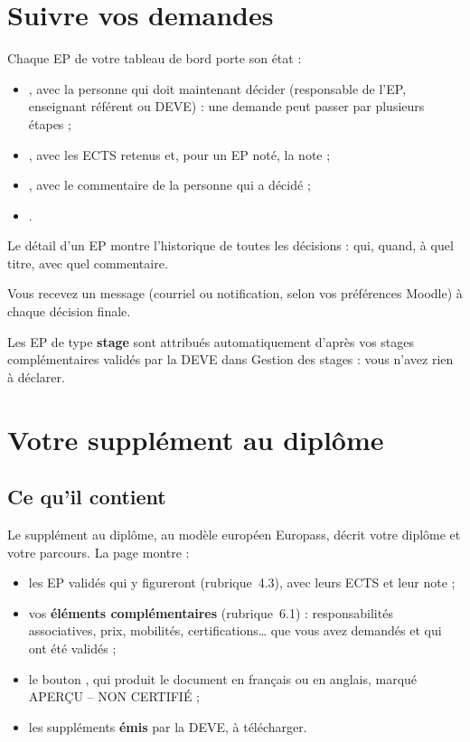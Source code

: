 \documentclass[11pt,a4paper]{article}
\begin{document}
\section{Suivre vos demandes}

Chaque EP de votre tableau de bord porte son état :
\begin{itemize}
  \item {}, avec la personne qui doit maintenant décider (responsable de l'EP,
    enseignant référent ou DEVE) : une demande peut passer par plusieurs étapes ;
  \item {}, avec les ECTS retenus et, pour un EP noté, la note ;
  \item {}, avec le commentaire de la personne qui a décidé ;
  \item {}.
\end{itemize}
Le détail d'un EP montre l'historique de toutes les décisions : qui, quand, à quel titre, avec
quel commentaire.

Vous recevez un message (courriel ou notification, selon vos préférences Moodle) à chaque
décision finale.

Les EP de type \textbf{stage} sont attribués automatiquement d'après vos stages complémentaires
validés par la DEVE dans \og Gestion des stages\fg{} : vous n'avez rien à déclarer.

\section{Votre supplément au diplôme}

\subsection{Ce qu'il contient}

Le supplément au diplôme, au modèle européen Europass, décrit votre diplôme et votre parcours.
La page  montre :
\begin{itemize}
  \item les EP validés qui y figureront (rubrique~4.3), avec leurs ECTS et leur note ;
  \item vos \textbf{éléments complémentaires} (rubrique~6.1) : responsabilités associatives,
    prix, mobilités, certifications\dots{} que vous avez demandés et qui ont été validés ;
  \item le bouton , qui produit le document en français ou en
    anglais, marqué \og APERÇU -- NON CERTIFIÉ\fg{} ;
  \item les suppléments \textbf{émis} par la DEVE, à télécharger.
\end{itemize}
\end{document}
